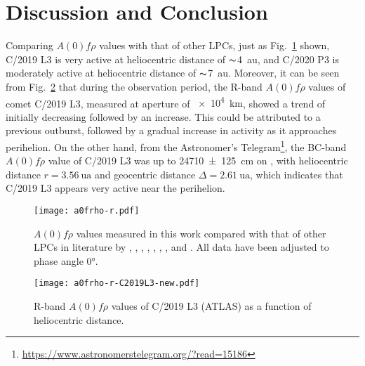 \section{Discussion and Conclusion}\label{sec:dis}

Comparing $A(0)f\rho$ values with that of other LPCs, just as Fig.~\ref{fig:afrho-ref} shown, C/2019 L3 is very active at heliocentric distance of $\thicksim${\qty{4}{\astronomicalunit}}, and C/2020 P3 is moderately active at heliocentric distance of $\thicksim${\qty{7}{\astronomicalunit}}. 
Moreover, it can be seen from Fig.~\ref{fig:a0frho-c2019} that during the observation period, the R-band $A(0)f\rho$ values of comet C/2019 L3, measured at aperture of {\qty{e4}{\km}}, showed a trend of initially decreasing followed by an increase. This could be attributed to a previous outburst, followed by a gradual increase in activity as it approaches perihelion. 
On the other hand, from the Astronomer's Telegram\footnote{\url{https://www.astronomerstelegram.org/?read=15186}}, the BC-band $A(0)f\rho$ value of C/2019 L3 was up to \qty{24710 +- 125}{\cm} on , with heliocentric distance $r = \qty{3.56}{\astronomicalunit}$ and geocentric distance $\Delta = \qty{2.61}{\astronomicalunit}$, which indicates that C/2019 L3 appears very active near the perihelion. 

\begin{figure}
    \centering
    \texttt{[image: a0frho-r.pdf]}
    \caption{$A(0)f\rho$ values measured in this work compared with that of other LPCs in  literature by \citet{mazzotta_epifani_observational_2014}, \citet{garcia_photometry_2021}, \citet{garcia_observational_2020}, \citet{rousselot_monitoring_2014}, \citet{meech_activity_2009}, \citet{sarneczky_activity_2016}, \citet{solontoi_ensemble_2012}, and \citet{szabo_spectrophotometry_2002}. All data have been adjusted to phase angle \ang{0}. }\label{fig:afrho-ref}
\end{figure}

\begin{figure}
    \centering
    \texttt{[image: a0frho-r-C2019L3-new.pdf]}
    \caption{R-band $A(0)f\rho$ values of C/2019 L3 (ATLAS) as a function of heliocentric distance. }\label{fig:a0frho-c2019}
\end{figure}


